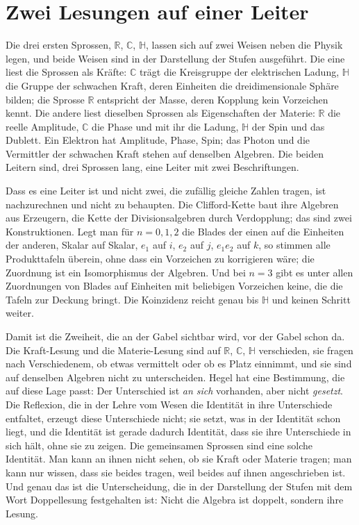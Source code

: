 \documentclass[11pt,a4paper]{article}
\newcommand{\Randlesart}{\marginpar{\raggedright\footnotesize\textcolor{lesart}{$\bigcirc$\,Lesart}}}
\newcommand{\R}{\mathbb R}
\newcommand{\C}{\mathbb C}
\newcommand{\HH}{\mathbb H}
\begin{document}
\section{Zwei Lesungen auf einer Leiter}
\label{sec:lesungen}

Die drei ersten Sprossen, $\R$, $\C$, $\HH$, lassen sich auf zwei Weisen neben die Physik legen, und beide Weisen sind in der Darstellung der Stufen ausgeführt. Die eine liest die Sprossen als Kräfte: $\C$ trägt die Kreisgruppe der elektrischen Ladung, $\HH$ die Gruppe der schwachen Kraft, deren Einheiten die dreidimensionale Sphäre bilden; die Sprosse $\R$ entspricht der Masse, deren Kopplung kein Vorzeichen kennt. Die andere liest dieselben Sprossen als Eigenschaften der Materie: $\R$ die reelle Amplitude, $\C$ die Phase und mit ihr die Ladung, $\HH$ der Spin und das Dublett. Ein Elektron hat Amplitude, Phase, Spin; das Photon und die Vermittler der schwachen Kraft stehen auf denselben Algebren. Die beiden Leitern sind, drei Sprossen lang, eine Leiter mit zwei Beschriftungen.

Dass es eine Leiter ist und nicht zwei, die zufällig gleiche Zahlen tragen, ist nachzurechnen und nicht zu behaupten. Die Clifford-Kette baut ihre Algebren aus Erzeugern, die Kette der Divisionsalgebren durch Verdopplung; das sind zwei Konstruktionen. Legt man für $n=0,1,2$ die Blades der einen auf die Einheiten der anderen, Skalar auf Skalar, $e_1$ auf $i$, $e_2$ auf $j$, $e_1e_2$ auf $k$, so stimmen alle Produkttafeln überein, ohne dass ein Vorzeichen zu korrigieren wäre; die Zuordnung ist ein Isomorphismus der Algebren. Und bei $n=3$ gibt es unter allen Zuordnungen von Blades auf Einheiten mit beliebigen Vorzeichen keine, die die Tafeln zur Deckung bringt. Die Koinzidenz reicht genau bis $\HH$ und keinen Schritt weiter.

\Randlesart Damit ist die Zweiheit, die an der Gabel sichtbar wird, vor der Gabel schon da. Die Kraft-Lesung und die Materie-Lesung sind auf $\R$, $\C$, $\HH$ verschieden, sie fragen nach Verschiedenem, ob etwas vermittelt oder ob es Platz einnimmt, und sie sind auf denselben Algebren nicht zu unterscheiden. Hegel hat eine Bestimmung, die auf diese Lage passt: Der Unterschied ist \emph{an sich} vorhanden, aber nicht \emph{gesetzt}. Die Reflexion, die in der Lehre vom Wesen die Identität in ihre Unterschiede entfaltet, erzeugt diese Unterschiede nicht; sie setzt, was in der Identität schon liegt, und die Identität ist gerade dadurch Identität, dass sie ihre Unterschiede in sich hält, ohne sie zu zeigen. Die gemeinsamen Sprossen sind eine solche Identität. Man kann an ihnen nicht sehen, ob sie Kraft oder Materie tragen; man kann nur wissen, dass sie beides tragen, weil beides auf ihnen angeschrieben ist. Und genau das ist die Unterscheidung, die in der Darstellung der Stufen mit dem Wort Doppellesung festgehalten ist: Nicht die Algebra ist doppelt, sondern ihre Lesung.
\end{document}
